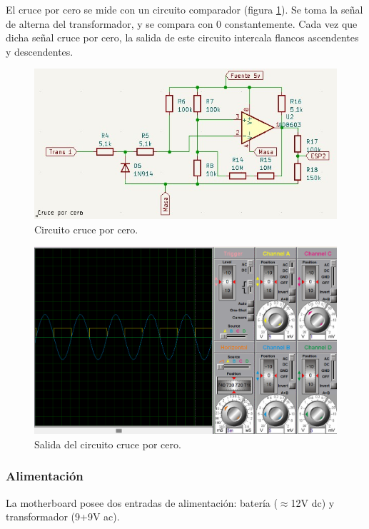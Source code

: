 El cruce por cero se mide con un circuito comparador (figura \ref{fig:cruce-cero}). Se toma la señal de alterna del transformador, y se compara con 0 constantemente. Cada vez que dicha señal cruce por cero, la salida de este circuito intercala flancos ascendentes y descendentes.\\

\begin{figure}[H]
    \centering
    \includegraphics[width=0.9\linewidth]{hardware/Screenshot_15.jpg}
    \caption{Circuito cruce por cero.}
    \label{fig:cruce-cero}
\end{figure}

\begin{figure}[H]
    \centering
    \includegraphics[width=1\linewidth]{hardware/Screenshot_26.png}
    \caption{Salida del circuito cruce por cero.}
    \label{fig:cruce,cero}
\end{figure}

\subsubsection{Alimentación}

La motherboard posee dos entradas de alimentación: batería ($\approx$12V dc) y transformador (9+9V ac).\\

